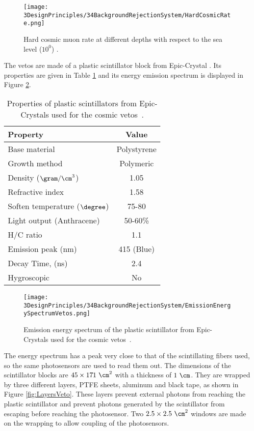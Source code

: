 \begin{figure}[h]
\centering
\texttt{[image: 3DesignPrinciples/34BackgroundRejectionSystem/HardCosmicRate.png]}
\caption{Hard cosmic muon rate at different depths with respect to the sea level ($10^0$) \cite{HardCosmicMuonRatePlot}.\label{fig:HardCoscmicRate}}
\end{figure}

The vetos are made of a plastic scintillator block from Epic-Crystal \cite{ScintillatorVeto}. Its properties are given in Table \ref{tab:ParametersScintillatorVeto} and its energy emission spectrum is displayed in Figure \ref{fig:EmissionEnergySpectrumVeto}.

\begin{table}[htbp]
\centering{}%
\begin{tabular}{lc}
\toprule 
Property & Value \tabularnewline
\midrule
\midrule 
Base material & Polystyrene \tabularnewline
Growth method & Polymeric \tabularnewline
Density ($\gram/\cm^3$)& 1.05 \tabularnewline
Refractive index & 1.58 \tabularnewline
Soften temperature ($\degree$) & 75-80 \tabularnewline
Light output (Anthracene) & 50-60\% \tabularnewline
H/C ratio & 1.1 \tabularnewline
Emission peak (nm) & 415 (Blue) \tabularnewline
Decay Time, (ns) & 2.4 \tabularnewline
Hygroscopic & No \tabularnewline
\bottomrule
\end{tabular}
\caption{Properties of plastic scintillators from Epic-Crystals used for the cosmic vetos~\cite{ScintillatorVeto}.}
\label{tab:ParametersScintillatorVeto}
\end{table}

\begin{figure}[]
\centering
\texttt{[image: 3DesignPrinciples/34BackgroundRejectionSystem/EmissionEnergySpectrumVetos.png]}
\caption{Emission energy spectrum of the plastic scintillator from Epic-Crystals used for the cosmic vetos\label{fig:EmissionEnergySpectrumVeto}~\cite{ScintillatorVeto}.}
\end{figure}

The energy spectrum has a peak very close to that of the scintillating fibers used, so the same photosensors are used to read them out. The dimensions of the scintillator blocks are $45 \times 17 \dot{} 1~\cm^2$ with a thickness of $1~\cm$. They are wrapped by three different layers, PTFE sheets, aluminum and black tape, as shown in Figure \ref{fig:LayersVeto}. These layers prevent external photons from reaching the plastic scintillator and prevent photons generated by the scintillator from escaping before reaching the photosensor. Two $2.5\times 2.5 ~\cm^2$ windows are made on the wrapping to allow coupling of the photosensors.


